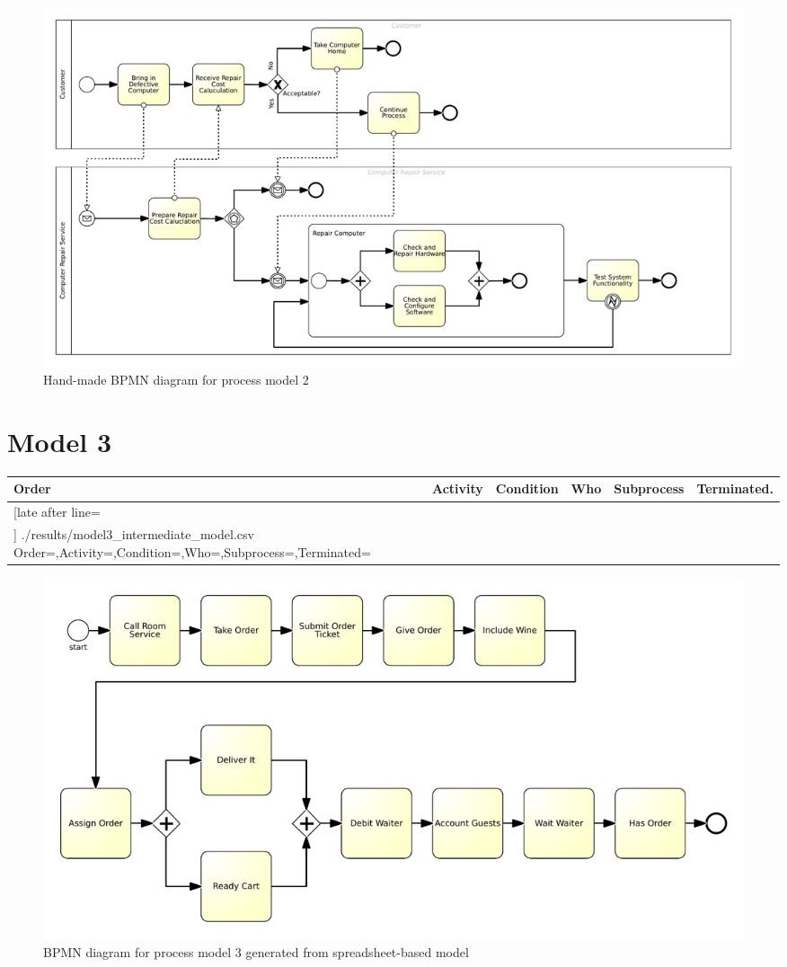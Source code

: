 \begin{figure}[H]
	\centering
	\includegraphics[width=\hsize]{./bpmn/model2.pdf}
	\caption{Hand-made BPMN diagram for process model 2}
	\label{bpmn:model2}
\end{figure}

\section{Model 3}
\begin{tcolorbox}[
	breakable,
	arc=0mm,
	left=1pt,
	right = 1pt,
	boxrule=0mm,
	colback = {white},
	]
	\texttt{}
\end{tcolorbox}
\label{txt:model3}

{\scriptsize
	\begin{longtable}{|p{0.03 \hsize}|p{0.25 \hsize}|p{0.15 \hsize}|p{0.2 \hsize}|p{0.1 \hsize}|p{0.1 \hsize}|}
		\hline
		Order & Activity & Condition & Who & Subprocess & Terminated.
		\\\hline\hline
		\csvreader[late after line=\\\hline]
		{./results/model3_intermediate_model.csv}
		{Order=\Order,Activity=\Activity,Condition=\Condition,Who=\Who,Subprocess=\Subprocess,Terminated=\Terminated}
		{\Order & \Activity & \Condition & \Who & \Subprocess & \Terminated}
		\caption{Spreadsheet-based description for process model 3}
		\label{csv:model3}
	\end{longtable}
}

\begin{figure}[H]
	\centering
	\includegraphics[width=\hsize]{./generated_bpmn/model3.pdf}
	\caption{BPMN diagram for process model 3 generated from spreadsheet-based model}
	\label{bpmn:generated_model3}
\end{figure}


